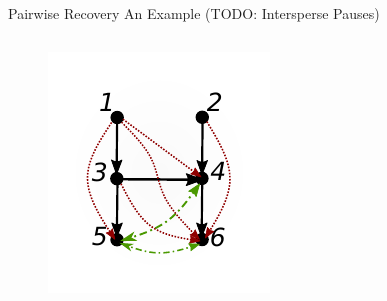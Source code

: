 \documentclass{beamer} %
\begin{document}
\begin{frame}{Pairwise Recovery}
  An Example (TODO: Intersperse Pauses)

  \begin{columns}
    \begin{column}{0.5\linewidth}
      \begin{figure}
        \includegraphics[width=\linewidth]{../../figures/example_algorithm.pdf}
      \end{figure}
    \end{column}


\end{columns}
\end{frame}
\end{document}
